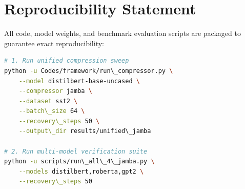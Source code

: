 \section{Reproducibility Statement}
All code, model weights, and benchmark evaluation scripts are packaged to guarantee exact reproducibility:
\begin{lstlisting}[language=bash]
# 1. Run unified compression sweep
python -u Codes/framework/run\_compressor.py \
    --model distilbert-base-uncased \
    --compressor jamba \
    --dataset sst2 \
    --batch\_size 64 \
    --recovery\_steps 50 \
    --output\_dir results/unified\_jamba

# 2. Run multi-model verification suite
python -u scripts/run\_all\_4\_jamba.py \
    --models distilbert,roberta,gpt2 \
    --recovery\_steps 50
\end{lstlisting}
